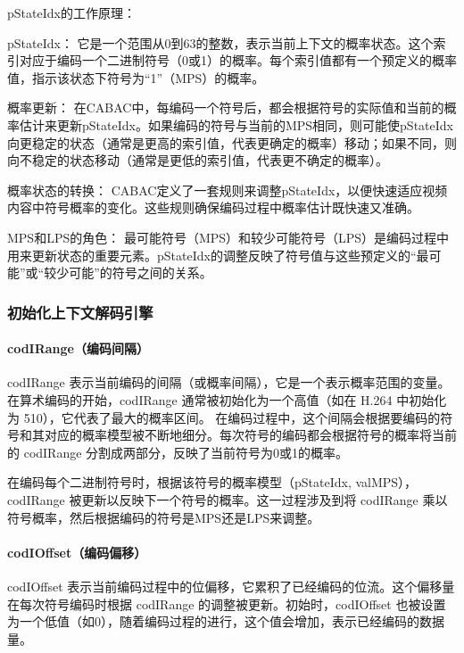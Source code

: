\documentclass{/Users/hi/Study/template/code}
\begin{document}
pStateIdx的工作原理：
\begin{serialNumber}
	\item pStateIdx： 它是一个范围从0到63的整数，表示当前上下文的概率状态。这个索引对应于编码一个二进制符号（0或1）的概率。每个索引值都有一个预定义的概率值，指示该状态下符号为“1”（MPS）的概率。
	\item 概率更新： 在CABAC中，每编码一个符号后，都会根据符号的实际值和当前的概率估计来更新pStateIdx。如果编码的符号与当前的MPS相同，则可能使pStateIdx向更稳定的状态（通常是更高的索引值，代表更确定的概率）移动；如果不同，则向不稳定的状态移动（通常是更低的索引值，代表更不确定的概率）。
	\item 概率状态的转换： CABAC定义了一套规则来调整pStateIdx，以便快速适应视频内容中符号概率的变化。这些规则确保编码过程中概率估计既快速又准确。
	\item MPS和LPS的角色： 最可能符号（MPS）和较少可能符号（LPS）是编码过程中用来更新状态的重要元素。pStateIdx的调整反映了符号值与这些预定义的“最可能”或“较少可能”的符号之间的关系。
\end{serialNumber}

\subsubsection{初始化上下文解码引擎}
\paragraph{codIRange（编码间隔）}
codIRange 表示当前编码的间隔（或概率间隔），它是一个表示概率范围的变量。在算术编码的开始，codIRange 通常被初始化为一个高值（如在 H.264 中初始化为 510），它代表了最大的概率区间。
在编码过程中，这个间隔会根据要编码的符号和其对应的概率模型被不断地细分。每次符号的编码都会根据符号的概率将当前的 codIRange 分割成两部分，反映了当前符号为0或1的概率。

在编码每个二进制符号时，根据该符号的概率模型（pStateIdx, valMPS），codIRange 被更新以反映下一个符号的概率。这一过程涉及到将 codIRange 乘以符号概率，然后根据编码的符号是MPS还是LPS来调整。


\paragraph{codIOffset（编码偏移）}
codIOffset 表示当前编码过程中的位偏移，它累积了已经编码的位流。这个偏移量在每次符号编码时根据 codIRange 的调整被更新。初始时，codIOffset 也被设置为一个低值（如0），随着编码过程的进行，这个值会增加，表示已经编码的数据量。
\end{document}
